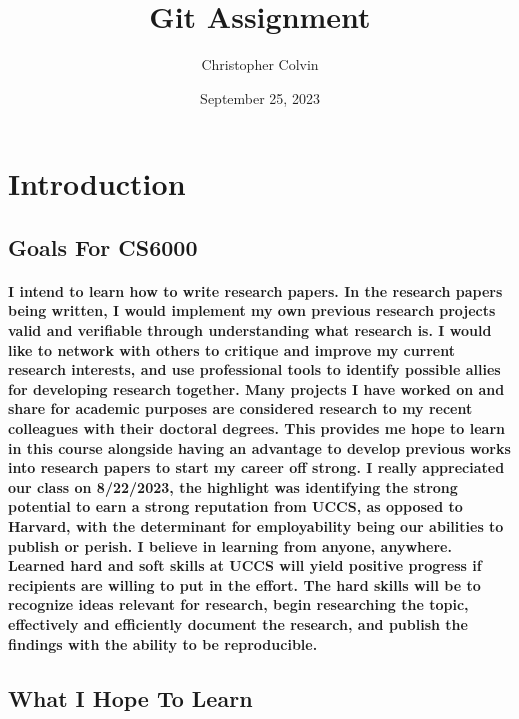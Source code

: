 \title{Git Assignment}
\author{Christopher Colvin}
\date{September 25, 2023}

\maketitle

\section{Introduction}
\subsection{Goals For CS6000}
\paragraph{\quad I intend to learn how to write research papers. In the research papers being written, I would implement my own previous research projects valid and verifiable through understanding what research is. I would like to network with others to critique and improve my current research interests, and use professional tools to identify possible allies for developing research together. Many projects I have worked on and share for academic purposes are considered research to my recent colleagues with their doctoral degrees. This provides me hope to learn in this course alongside having an advantage to develop previous works into research papers to start my career off strong. I really appreciated our class on 8/22/2023, the highlight was identifying the strong potential to earn a strong reputation from UCCS, as opposed to Harvard, with the determinant for employability being our abilities to publish or perish. I believe in learning from anyone, anywhere. Learned hard and soft skills at UCCS will yield positive progress if recipients are willing to put in the effort. The hard skills will be to recognize ideas relevant for research, begin researching the topic, effectively and efficiently document the research, and publish the findings with the ability to be reproducible.}
\subsection{What I Hope To Learn}
